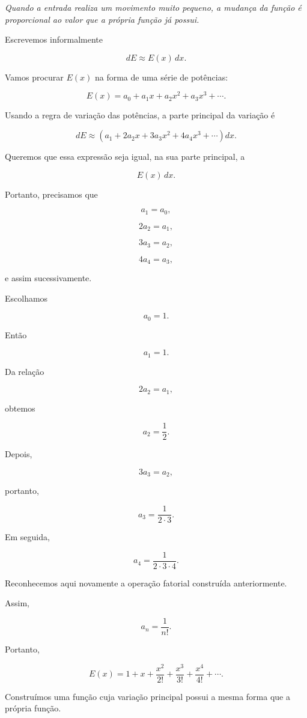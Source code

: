 \documentclass[12pt,a4paper]{article}
\begin{document}
\begin{center}
\emph{Quando a entrada realiza um movimento muito pequeno, a mudança
da função é proporcional ao valor que a própria função já possui.}
\end{center}

Escrevemos informalmente

\[
dE\approx E(x)\,dx.
\]

Vamos procurar \(E(x)\) na forma de uma série de potências:

\[
E(x)
=
a_0+a_1x+a_2x^2+a_3x^3+\cdots.
\]

Usando a regra de variação das potências, a parte principal da variação
é

\[
dE
\approx
\left(
a_1
+
2a_2x
+
3a_3x^2
+
4a_4x^3
+\cdots
\right)dx.
\]

Queremos que essa expressão seja igual, na sua parte principal, a

\[
E(x)\,dx.
\]

Portanto, precisamos que

\[
a_1=a_0,
\]

\[
2a_2=a_1,
\]

\[
3a_3=a_2,
\]

\[
4a_4=a_3,
\]

e assim sucessivamente.

Escolhamos

\[
a_0=1.
\]

Então

\[
a_1=1.
\]

Da relação

\[
2a_2=a_1,
\]

obtemos

\[
a_2=\frac12.
\]

Depois,

\[
3a_3=a_2,
\]

portanto,

\[
a_3=\frac{1}{2\cdot3}.
\]

Em seguida,

\[
a_4=\frac{1}{2\cdot3\cdot4}.
\]

Reconhecemos aqui novamente a operação fatorial construída anteriormente.

Assim,

\[
a_n=\frac{1}{n!}.
\]

Portanto,

\[
E(x)
=
1+x+\frac{x^2}{2!}
+\frac{x^3}{3!}
+\frac{x^4}{4!}
+\cdots.
\]

Construímos uma função cuja variação principal possui a mesma forma que
a própria função.
\end{document}
